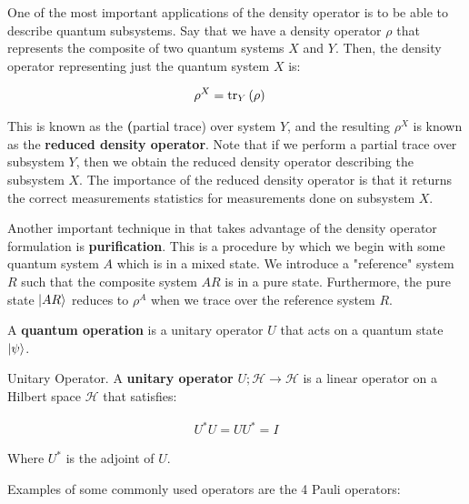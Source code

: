 One of the most important applications of the density operator is to be able to describe quantum subsystems. Say that we have a density operator $\rho$ that represents the composite of two quantum systems $X$ and $Y$. Then, the density operator representing just the quantum system $X$ is:

\begin{align}
    \rho^X &= \trace[Y]{\rho}
\end{align}

This is known as the \textbf(partial trace) over system $Y$, and the resulting $\rho^X$ is known as the \textbf{reduced density operator}. Note that if we perform a partial trace over subsystem $Y$, then we obtain the reduced density operator describing the subsystem $X$. The importance of the reduced density operator is that it returns the correct measurements statistics for measurements done on subsystem $X$.

Another important technique in that takes advantage of the density operator formulation is \textbf{purification}. This is a procedure by which we begin with some quantum system $A$ which is in a mixed state. We introduce a "reference" system $R$ such that the composite system $AR$ is in a pure state. Furthermore, the pure state $\ket{AR}$ reduces to $\rho^A$ when we trace over the reference system $R$.

A \textbf{quantum operation} is a unitary operator $U$ that acts on a quantum state $\ket{\psi}$.

\begin{definition}{Unitary Operator.}
    A \textbf{unitary operator} $U;\mathcal{H} \to \mathcal{H}$ is a linear operator on a Hilbert space $\mathcal{H}$ that satisfies:
    
    \begin{align}
        U^*U = UU^* = I
    \end{align}
    
    Where $U^*$ is the adjoint of $U$.
\end{definition}

Examples of some commonly used operators are the 4 Pauli operators:

